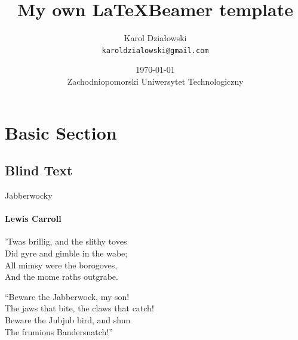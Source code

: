\documentclass{beamer}
\title{My own \LaTeX Beamer template}
\date[\today]{\today \\ Zachodniopomorski Uniwersytet Technologiczny}
\author[Działowski]{Karol Działowski \\ \texttt{karoldzialowski@gmail.com}}
\begin{document}
\begin{frame}
\titlepage
\end{frame}

\section{Basic Section}
\subsection{Blind Text}
\begin{frame}{Jabberwocky}
    \framesubtitle{Lewis Carroll}%
    'Twas brillig, and the slithy toves\\
    Did gyre and gimble in the wabe;\\
    All mimsy were the borogoves,\\
    And the mome raths outgrabe.\\\bigskip

    “Beware the Jabberwock, my son!\\
    The jaws that bite, the claws that catch!\\
    Beware the Jubjub bird, and shun\\
    The frumious Bandersnatch!”\\
\end{frame}
\end{document}
